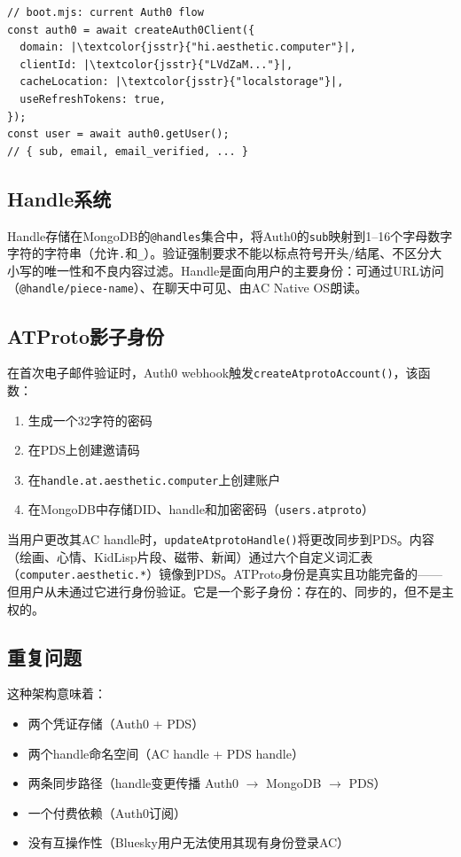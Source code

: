 \documentclass[10pt,letterpaper,twocolumn]{article}
\begin{document}
\begin{lstlisting}[style=acjsstyle]
// boot.mjs: current Auth0 flow
const auth0 = await createAuth0Client({
  domain: |\textcolor{jsstr}{"hi.aesthetic.computer"}|,
  clientId: |\textcolor{jsstr}{"LVdZaM..."}|,
  cacheLocation: |\textcolor{jsstr}{"localstorage"}|,
  useRefreshTokens: true,
});
const user = await auth0.getUser();
// { sub, email, email_verified, ... }
\end{lstlisting}

\subsection{Handle系统}

Handle存储在MongoDB的\texttt{@handles}集合中，将Auth0的\texttt{sub}映射到1--16个字母数字字符的字符串（允许\texttt{.}和\texttt{\_}）。验证强制要求不能以标点符号开头/结尾、不区分大小写的唯一性和不良内容过滤。Handle是面向用户的主要身份：可通过URL访问（\texttt{@handle/piece-name}）、在聊天中可见、由AC Native OS朗读。

\subsection{ATProto影子身份}

在首次电子邮件验证时，Auth0 webhook触发\texttt{createAtprotoAccount()}，该函数：

\begin{enumerate}
  \item 生成一个32字符的密码
  \item 在PDS上创建邀请码
  \item 在\texttt{handle.at.aesthetic.computer}上创建账户
  \item 在MongoDB中存储DID、handle和加密密码（\texttt{users.atproto}）
\end{enumerate}

当用户更改其AC handle时，\texttt{updateAtprotoHandle()}将更改同步到PDS。内容（绘画、心情、KidLisp片段、磁带、新闻）通过六个自定义词汇表（\texttt{computer.aesthetic.*}）镜像到PDS。ATProto身份是真实且功能完备的——但用户从未通过它进行身份验证。它是一个影子身份：存在的、同步的，但不是主权的。

\subsection{重复问题}

这种架构意味着：

\begin{itemize}
  \item 两个凭证存储（Auth0 + PDS）
  \item 两个handle命名空间（AC handle + PDS handle）
  \item 两条同步路径（handle变更传播 Auth0 $\to$ MongoDB $\to$ PDS）
  \item 一个付费依赖（Auth0订阅）
  \item 没有互操作性（Bluesky用户无法使用其现有身份登录AC）
\end{itemize}
\end{document}
